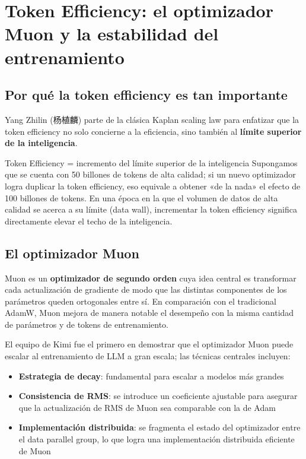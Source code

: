 \section{Token Efficiency: el optimizador Muon y la estabilidad del entrenamiento}

\subsection{Por qué la token efficiency es tan importante}

Yang Zhilin (杨植麟) parte de la clásica Kaplan scaling law para enfatizar que la token efficiency no solo concierne a la eficiencia, sino también al \textbf{límite superior de la inteligencia}.

\begin{importantbox}{Token Efficiency = incremento del límite superior de la inteligencia}
Supongamos que se cuenta con 50 billones de tokens de alta calidad; si un nuevo optimizador logra duplicar la token efficiency, eso equivale a obtener «de la nada» el efecto de 100 billones de tokens. En una época en la que el volumen de datos de alta calidad se acerca a su límite (data wall), incrementar la token efficiency significa directamente elevar el techo de la inteligencia.
\end{importantbox}

\subsection{El optimizador Muon}

Muon es un \textbf{optimizador de segundo orden} cuya idea central es transformar cada actualización de gradiente de modo que las distintas componentes de los parámetros queden ortogonales entre sí. En comparación con el tradicional AdamW, Muon mejora de manera notable el desempeño con la misma cantidad de parámetros y de tokens de entrenamiento.

El equipo de Kimi fue el primero en demostrar que el optimizador Muon puede escalar al entrenamiento de LLM a gran escala; las técnicas centrales incluyen:
\begin{itemize}
    \item \textbf{Estrategia de decay}: fundamental para escalar a modelos más grandes
    \item \textbf{Consistencia de RMS}: se introduce un coeficiente ajustable para asegurar que la actualización de RMS de Muon sea comparable con la de Adam
    \item \textbf{Implementación distribuida}: se fragmenta el estado del optimizador entre el data parallel group, lo que logra una implementación distribuida eficiente de Muon
\end{itemize}

